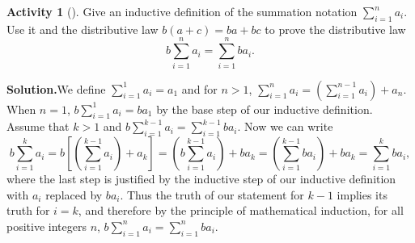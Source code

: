 \documentclass[10pt,]{book}
\theoremstyle{plain}
\theoremstyle{definition}
\newtheorem{activity}[project]{Activity}
\numberwithin{equation}{chapter}
\begin{document}
\begin{activity}[]\label{activity-29}
Give an inductive definition of the summation notation \(\sum_{i=1}^n a_i\). Use it and the distributive law \(b(a+c) = ba+bc\) to prove the distributive law%
\begin{equation*}
b\sum_{i=1}^n a_i = \sum_{i=1}^n ba_i.
\end{equation*}
%
\par\medskip\noindent%
\textbf{Solution.}\quad We define \(\sum_{i=1}^1a_i = a_1\) and for \(n>1\), \(\sum_{i=1}^n
a_i =  \left(\sum_{i=1}^{n-1}a_i\right) +a_n\). When \(n=1\), \(b\sum_{i=1}^1a_i =ba_1\) by the base step of our inductive definition. Assume that \(k>1\) and \(b\sum_{i=1}^{k-1}a_i=\sum_{i=1}^{k-1}ba_i\). Now we can write%
\begin{equation*}
b\sum_{i=1}^k a_i\!=\! b\left[\left(\sum_{i=1}^{k-1}a_i\right)+a_k\right]
\!=\!
\left(b\sum_{i=1}^{k-1}a_i\right) +ba_k \!=\! \left(\sum_{i=1}^{k-1}ba_i\right)
+ ba_k \!=\! \sum_{i=1}^k ba_i,
\end{equation*}
where the last step is justified by the inductive step of our inductive definition with \(a_i\) replaced by \(ba_i\). Thus the truth of our statement for \(k-1\) implies its truth for \(i=k\), and therefore by the principle of mathematical induction, for all positive integers \(n\), \(b\sum_{i=1}^na_i= \sum_{i=1}^nba_i\).%
\end{activity}
\typeout{************************************************}
\typeout{************************************************}
\end{document}
